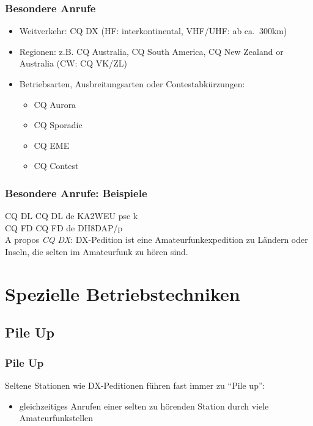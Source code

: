 \begin{frame}
    \frametitle{Besondere Anrufe}

    \begin{itemize}
        \item Weitverkehr: CQ DX (HF: interkontinental, VHF/UHF: ab ca.~300km)
        \item Regionen: z.B. CQ Australia, CQ South America, CQ New Zealand or
              Australia (CW: CQ VK/ZL)
        \item Betriebsarten, Ausbreitungsarten oder Contestabkürzungen:
        \begin{itemize}
            \item CQ Aurora
            \item CQ Sporadic
            \item CQ EME
            \item CQ Contest
        \end{itemize}
    \end{itemize}
\end{frame}

\begin{frame}
    \frametitle{Besondere Anrufe: Beispiele}

    CQ DL CQ DL de KA2WEU pse k \\[2em]

    CQ FD CQ FD de DH8DAP/p \\[2em]

    A propos \emph{CQ DX}: DX-Pedition ist eine Amateurfunkexpedition zu Ländern
    oder Inseln, die selten im Amateurfunk zu hören sind.

\end{frame}

\section{Spezielle Betriebstechniken}

\subsection{Pile Up}


\begin{frame}
    \frametitle{Pile Up}

    Seltene Stationen wie DX-Peditionen führen fast
    immer zu ``Pile up'':

    \begin{itemize}
        \item gleichzeitiges Anrufen einer selten zu hörenden Station durch
              viele Amateurfunkstellen
    \end{itemize}
\end{frame}

